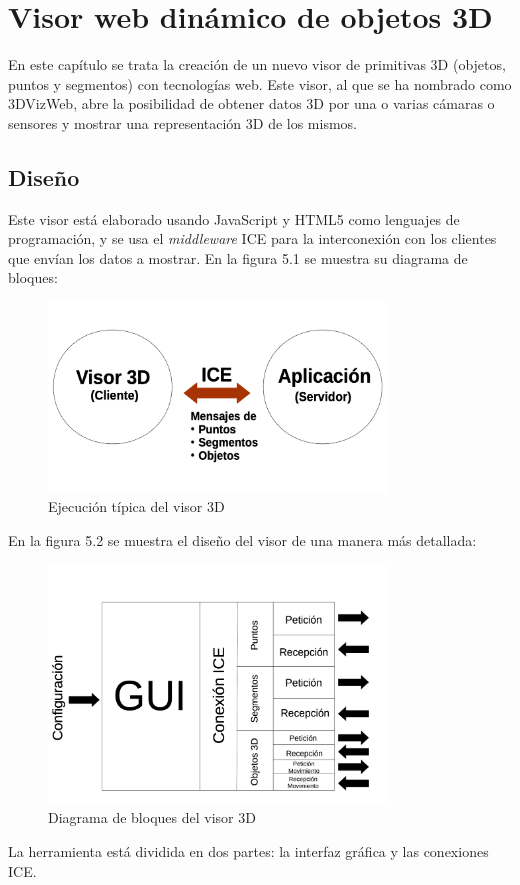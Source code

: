\chapter{Visor web dinámico de objetos 3D}\label{cap.visor3d}
En este capítulo se trata la creación de un nuevo visor de primitivas 3D (objetos, puntos y segmentos) con tecnologías web. Este visor, al que se ha nombrado como 3DVizWeb,  abre la posibilidad de obtener datos 3D por una o varias cámaras o sensores y mostrar una representación 3D de los mismos.
\section{Diseño}
Este visor está elaborado usando JavaScript y HTML5 como lenguajes de programación, y se usa el \textit{middleware} ICE para la interconexión con los clientes que envían los datos a mostrar. En la figura 5.1 se muestra su diagrama de bloques:

\begin{figure}[H]
  \begin{center}
    \includegraphics[width=0.8\textwidth]{figures/esquemavisor.png}
		\caption{Ejecución típica del visor 3D}
		\label{fig.diseno3dviz}
		\end{center}
\end{figure}

En la figura 5.2 se muestra el diseño del visor de una manera más detallada:

\begin{figure}[H]
  \begin{center}
    \includegraphics[width=0.8\textwidth]{figures/diseno3dviz.png}
		\caption{Diagrama de bloques del visor 3D}
		\label{fig.diseno3dviz}
		\end{center}
\end{figure}
La herramienta está dividida en dos partes: la interfaz gráfica y las conexiones ICE.

